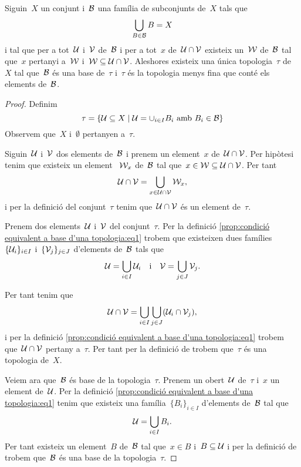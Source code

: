 \documentclass[../../main.tex]{subfiles}
\begin{document}
	\begin{proposition}
		\label{prop:condició equivalent a base d'una topologia}
		\label{prop:condició per que una topologia sigui la més fina que conté una base}
		Siguin~\(X\) un conjunt i~\(\mathcal{B}\) una família de subconjunts de~\(X\) tals que
		\[
		    \bigcup_{B\in\mathcal{B}}B=X
		\]
		i tal que per a tot~\(\mathcal{U}\) i~\(\mathcal{V}\) de~\(\mathcal{B}\) i per a tot~\(x\) de~\(\mathcal{U}\cap\mathcal{V}\) existeix un~\(\mathcal{W}\) de~\(\mathcal{B}\) tal que~\(x\) pertanyi a~\(\mathcal{W}\) i~\(\mathcal{W}\subseteq\mathcal{U}\cap\mathcal{V}\).	Aleshores existeix una única topologia~\(\tau\) de~\(X\) tal que~\(\mathcal{B}\) és una base de~\(\tau\) i~\(\tau\) és la topologia menys fina que conté els elements de~\(\mathcal{B}\).
		\begin{proof}
			Definim
			\begin{equation}
				\label{prop:condició equivalent a base d'una topologia:eq1}
				\tau=\left\{\obert{U}\subseteq X\mid\obert{U}=\cup_{i\in I}B_{i}\text{ amb }B_{i}\in\base{B}\right\}
			\end{equation}
			Observem que~\(X\) i~\(\emptyset\) pertanyen a~\(\tau\).

			Siguin~\(\mathcal{U}\) i~\(\mathcal{V}\) dos elements de~\(\mathcal{B}\) i prenem un element~\(x\) de~\(\mathcal{U}\cap\mathcal{V}\).
			Per hipòtesi tenim que existeix un element ~\(\mathcal{W}_{x}\) de~\(\mathcal{B}\) tal que~\(x\in\mathcal{W}\subseteq\mathcal{U}\cap\mathcal{V}\).
			Per tant
			\[
			    \mathcal{U}\cap\mathcal{V}=\bigcup_{x\in\mathcal{U}\cap\mathcal{V}}\mathcal{W}_{x},
			\]
			i per la definició del conjunt~\(\tau\) tenim que~\(\mathcal{U}\cap\mathcal{V}\) és un element de~\(\tau\).

			Prenem dos elements~\(\mathcal{U}\) i~\(\mathcal{V}\) del conjunt~\(\tau\).
			Per la definició \eqref{prop:condició equivalent a base d'una topologia:eq1} trobem que existeixen dues famílies~\(\{\mathcal{U}_{i}\}_{i\in I}\) i~\(\{\mathcal{V}_{j}\}_{j\in J}\) d'elements de~\(\mathcal{B}\) tals que
			\[
			    \mathcal{U}=\bigcup_{i\in I}\mathcal{U}_{i}\quad\text{i}\quad\mathcal{V}=\bigcup_{j\in J}\mathcal{V}_{j}.
			\]

			Per tant tenim que
			\[
			    \mathcal{U}\cap\mathcal{V}=\bigcup_{i\in I}\bigcup_{j\in J}(\mathcal{U}_{i}\cap\mathcal{V}_{j}),
			\]
			i per la definició \eqref{prop:condició equivalent a base d'una topologia:eq1} trobem que~\(\mathcal{U}\cap\mathcal{V}\) pertany a~\(\tau\).
			Per tant per la definició de  trobem que~\(\tau\) és una topologia de~\(X\).

			Veiem ara que~\(\mathcal{B}\) és base de la topologia~\(\tau\).
			Prenem un obert~\(\mathcal{U}\) de~\(\tau\) i~\(x\) un element de~\(\mathcal{U}\).
			Per la definició \eqref{prop:condició equivalent a base d'una topologia:eq1} tenim que existeix una família~\(\{B_{i}\}_{i\in I}\) d'elements de~\(\mathcal{B}\) tal que
			\[
			    \mathcal{U}=\bigcup_{i\in I}B_{i}.
			\]
			Per tant existeix un element~\(B\) de~\(\mathcal{B}\) tal que~\(x\in B\) i~\(B\subseteq\mathcal{U}\) i per la definició de  trobem que~\(\mathcal{B}\) és una base de la topologia~\(\tau\).


\end{proof}
\end{proposition}
\end{document}
